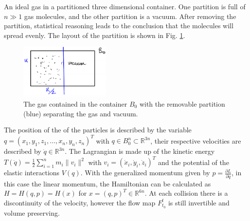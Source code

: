 \begin{ex}
	An ideal gas in a partitioned three dimensional container. One partition is full of $n \gg 1$ gas molecules, and the other partition is a vacuum. After removing the partition, statistical reasoning leads to the conclusion that the molecules will spread evenly. The layout of the partition is shown in Fig. \ref{fig:partitioned_gas}.
\begin{figure}[h!]
	\centering
	\includegraphics[width=0.4\textwidth]{figures/ch8/14partioned_container.png}
	\caption{The gas contained in the container $B_0$ with the removable partition (blue) separating the gas and vacuum.}
	\label{fig:partitioned_gas}
\end{figure}
The position of the  of the particles is described by the variable $q=(x_1, y_1, z_1, \ldots, x_n, y_n, z_n)^{T}$ with $q\in B_0^{n} \subset \mathbb{R}^{3n}$, their respective velocities are described by $\dot{q}\in \mathbb{R}^{3n}$. The Lagrangian is made up of the kinetic energy $T(\dot{q}) = \frac{1}{2}\sum_{i=1}^{n}m_i \|v_i\|^{2} $ with $v_i = (\dot{x}_i, \dot{y}_i, \dot{z}_i)^{T}$ and the potential of the elastic interactions $V(q)$. With the generalized momentum given by $p=\frac{\partial L}{\partial \dot{q}} $, in this case the linear momentum, the Hamiltonian can be calculated as $H=H(q,p)=H(x) $ for $x= (q,p)^{T}\in \mathbb{R}^{6n}$. At each collision there is a discontinuity of the velocity, however the flow map $F_{t_0}^{t}$ is still invertible and volume preserving.


\end{ex}
